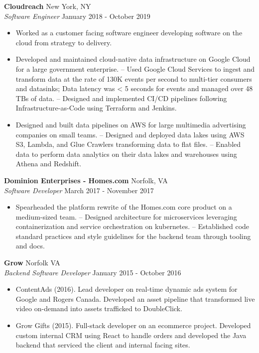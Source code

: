 \documentclass[a4paper]{article}
\begin{document}
\textbf{Cloudreach} \hfill New York, NY\\
\textit{Software Engineer} \hfill January 2018 - October 2019 \\
\vspace{-1mm}
\begin{itemize} \itemsep 1pt
	\item Worked as a customer facing software engineer developing software on the cloud from strategy to delivery.
	\item Developed and maintained cloud-native data infrastructure on Google Cloud for a large government enterprise. – Used Google Cloud Services to ingest and transform data at the rate of 130K events per second to multi-tier consumers and datasinks; Data latency was \textless{} 5 seconds for events and managed over 48 TBs of data. – Designed and implemented CI/CD pipelines following Infrastructure-as-Code using Terraform and Jenkins.
	\item Designed and built data pipelines on AWS for large multimedia advertising companies on small teams. – Designed and deployed data lakes using AWS S3, Lambda, and Glue Crawlers transforming data to flat files. – Enabled data to perform data analytics on their data lakes and warehouses using Athena and Redshift.
\end{itemize}
\textbf{Dominion Enterprises - Homes.com} \hfill Norfolk, VA\\
\textit{Software Developer} \hfill March 2017 - November 2017\\
\vspace{-1mm}
\begin{itemize} \itemsep 1pt
	\item Spearheaded the platform rewrite of the Homes.com core product on a medium-sized team. – Designed architecture for microservices leveraging containerization and service orchestration on kubernetes. – Established code standard practices and style guidelines for the backend team through tooling and docs.
\end{itemize}
\textbf{Grow} \hfill Norfolk VA\\
\textit{Backend Software Developer} \hfill January 2015 - October 2016\\
\vspace{-1mm}
\begin{itemize} \itemsep 1pt
	\item ContentAds (2016). Lead developer on real-time dynamic ads system for Google and Rogers Canada. Developed an asset pipeline that transformed live video on-demand into assets trafficked to DoubleClick.
	\item Grow Gifts (2015). Full-stack developer on an ecommerce project. Developed custom internal CRM using React to handle orders and developed the Java backend that serviced the client and internal facing sites.
\end{itemize}
\end{document}
